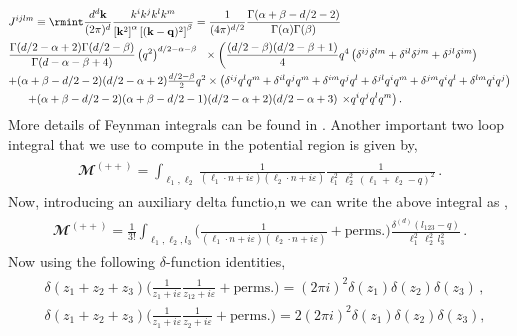 \begin{align}
\begin{split}
&J^{ijlm}\equiv\rmint \frac{d^d\bf{k}}{(2\pi)^d}\frac{k^ik^jk^lk^m}{\left[{\bf{k}}^2\right]^\alpha\left[({\bf{k}-\bf{q}})^2\right]^\beta}=\frac{1}{(4\pi)^{d/2}}\frac{\Gamma(\alpha+\beta-d/2-2)}{\Gamma(\alpha)\Gamma(\beta)}\\& \frac{\Gamma(d/2-\alpha+2)\Gamma(d/2-\beta)}{\Gamma(d-\alpha-\beta+4)}\left(q^2\right)^{d/2-\alpha-\beta}\,\,\,\,
\times\left(\frac{(d/2-\beta)(d/2-\beta+1)}{4}q^4\left(\delta^{ij}\delta^{lm}+\delta^{il}\delta^{jm}+\delta^{jl}\delta^{im}\right)\right.\\
& \textstyle{
+(\alpha+\beta-d/2-2)(d/2-\alpha+2)\frac{d/2-\beta}{2}q^2 
\times\left(\delta^{ij}q^lq^m+\delta^{il}q^jq^m+\delta^{im}q^jq^l+\delta^{jl}q^iq^m+\delta^{jm}q^iq^l+\delta^{lm}q^iq^j\right)}\\
&\left.\,\,\,\,\,\,\,\,\,
+(\alpha+\beta-d/2-2)(\alpha+\beta-d/2-1)(d/2-\alpha+2)(d/2-\alpha+3)\right.
\left.
\times q^iq^jq^lq^m\right).
\end{split}
\end{align}
More details of  Feynman integrals can be found in \cite{smirnov}.
Another important two loop integral that we use to compute in the potential region is given by,
\begin{align}
    \begin{split}
        \mathbfcal{M}^{(++)}=\int_{\ell_{1},\ell_{2}}\frac{1}{(\ell_{1}\cdot n+i\varepsilon)(\ell_{2}\cdot n+i\varepsilon)}\frac{1}{\ell_{1}^2\, \ell_{2}^2\, (\ell_{1}+\ell_{2}-q)^2}\,.\label{intextra}
    \end{split}
\end{align}
Now, introducing an auxiliary delta functio,n we can write the above integral as \cite{Saotome:2012vy, Parra-Martinez:2020dzs},
\begin{align}
    \begin{split}
        \mathbfcal{M}^{(++)}=\frac{1}{3!}\int_{\ell_{1},\ell_{2},l_3}\Bigg(\frac{1}{(\ell_{1}\cdot n+i\varepsilon)(\ell_{2}\cdot n+i\varepsilon)}+\textrm{perms.}\Bigg)\frac{\delta^{(d)}(l_{123}-q)}{\ell_{1}^2\, \ell_{2}^2\, l_3^2}\,.
    \end{split}
\end{align}
Now using the following $\delta$-function identities,
\begin{align}
    \begin{split}
        &\delta(z_1+z_2+z_3)\Bigg(\frac{1}{z_1+i\varepsilon}\frac{1}{z_{12}+i\varepsilon}+\textrm{perms.}\Bigg)=(2\pi i)^2 \delta(z_1)\delta(z_2)\delta(z_3)\,,\\ &
\delta(z_1+z_2+z_3)\Bigg(\frac{1}{z_1+i\varepsilon}\frac{1}{z_{2}+i\varepsilon}+\textrm{perms.}\Bigg)=2(2\pi i)^2 \delta(z_1)\delta(z_2)\delta(z_3),
    \end{split}
\end{align}
